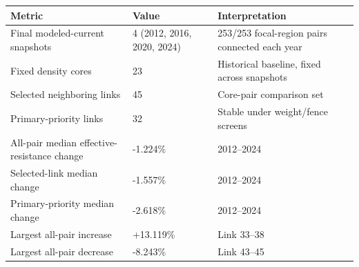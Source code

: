 \begin{tabular}{p{}p{}p{}}
\toprule
Metric & Value & Interpretation\\
\midrule
Final modeled-current snapshots & 4 (2012, 2016, 2020, 2024) & 253/253 focal-region pairs connected each year\\
Fixed density cores & 23 & Historical baseline, fixed across snapshots\\
Selected neighboring links & 45 & Core-pair comparison set\\
Primary-priority links & 32 & Stable under weight/fence screens\\
All-pair median effective-resistance change & -1.224\% & 2012--2024\\
Selected-link median change & -1.557\% & 2012--2024\\
Primary-priority median change & -2.618\% & 2012--2024\\
Largest all-pair increase & +13.119\% & Link 33--38\\
Largest all-pair decrease & -8.243\% & Link 43--45\\
\bottomrule
\end{tabular}
